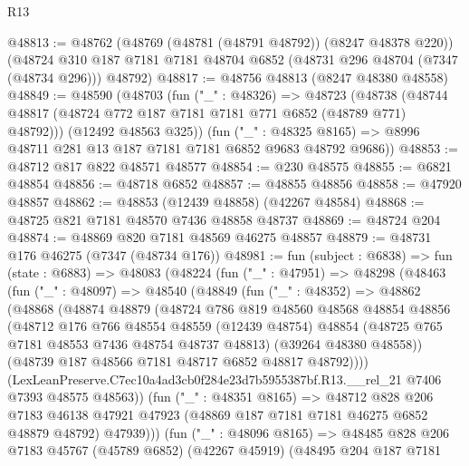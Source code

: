 \begin{lexlean}{R13}
\begin{coremodule}
@48813 := @48762
    (@48769 (@48781 (@48791 @48792)) (@8247 @48378 @220))
    (@48724 @310 @187 @7181 @7181 @48704 @6852 (@48731 @296 @48704 (@7347 (@48734 @296))) @48792)
@48817 := @48756 @48813 (@8247 @48380 @48558)
@48849 := @48590
    (@48703
      (fun ("_" : @48326) =>
      @48723
        (@48738 (@48744 @48817 (@48724 @772 @187 @7181 @7181 @771 @6852 (@48789 @771) @48792)))
        (@12492 @48563 @325))
      (fun ("_" : @48325 @8165) => @8996 @48711 @281 @13 @187 @7181 @7181 @6852 @9683 @48792 @9686))
@48853 := @48712 @817 @822 @48571 @48577
@48854 := @230 @48575
@48855 := @6821 @48854
@48856 := @48718 @6852
@48857 := @48855 @48856
@48858 := @47920 @48857
@48862 := @48853 (@12439 @48858) (@42267 @48584)
@48868 := @48725 @821 @7181 @48570 @7436 @48858 @48737
@48869 := @48724 @204
@48874 := @48869 @820 @7181 @48569 @46275 @48857
@48879 := @48731 @176 @46275 (@7347 (@48734 @176))
@48981 := fun (subject : @6838) =>
  fun (state : @6883) =>
  @48083
    (@48224
      (fun ("_" : @47951) =>
      @48298
        (@48463
          (fun ("_" : @48097) =>
          @48540
            (@48849
              (fun ("_" : @48352) =>
              @48862
                (@48868
                  (@48874
                    @48879
                    (@48724
                      @786
                      @819
                      @48560
                      @48568
                      @48854
                      @48856
                      (@48712
                        @176
                        @766
                        @48554
                        @48559
                        (@12439 @48754)
                        @48854
                        (@48725 @765 @7181 @48553 @7436 @48754 @48737 @48813)
                        (@39264 @48380 @48558))
                      (@48739 @187 @48566 @7181 @48717 @6852 @48817 @48792))))
                (LexLeanPreserve.C7ec10a4ad3cb0f284e23d7b5955387bf.R13.__rel_21
                  @7406
                  @7393
                  @48575
                  @48563))
              (fun ("_" : @48351 @8165) =>
              @48712
                @828
                @206
                @7183
                @46138
                @47921
                @47923
                (@48869 @187 @7181 @7181 @46275 @6852 @48879 @48792)
                @47939)))
          (fun ("_" : @48096 @8165) =>
          @48485
            @828
            @206
            @7183
            @45767
            (@45789 @6852)
            (@42267 @45919)
            (@48495
              @204
              @187
              @7181

\end{coremodule}
\end{lexlean}
